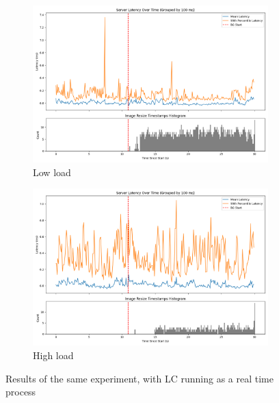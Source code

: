 \begin{figure}[t]
    \centering
    \begin{subfigure}[t]{0.48\columnwidth}
        \includegraphics[width=\columnwidth]{graphs/unedited-rt-low-two.png}
        \caption{Low load}\label{fig:unedited-rt-low-two}
    \end{subfigure}
    \hspace{\fill}
    \begin{subfigure}[t]{0.48\columnwidth}
        \includegraphics[width=\columnwidth]{graphs/unedited-rt-high-two.png}
        \caption{High load}\label{fig:unedited-rt-high-two}
    \end{subfigure}
    \vspace{4pt}
    \caption{Results of the same experiment, with LC running as a real time process}\label{fig:unedited-rt}
\end{figure}

